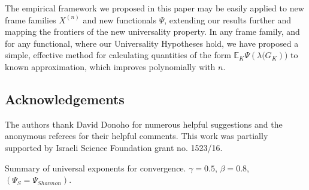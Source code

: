 \documentclass[a4paper,12pt]{article}
\newcommand{\E}{\ensuremath{\mathbb{E}}}
\newcommand{\specstat}{\ensuremath{\Psi}}
\begin{document}
The empirical framework we proposed in this paper may be easily applied to new
frame families $X^{(n)}$ and new functionals $\Psi$, extending our results further and
mapping the frontiers of the new universality property. 
In any frame family, and for any functional, where our Universality Hypotheses hold, we
have proposed a simple, effective method for calculating quantities of the form 
$\E_K \Psi\left( \lambda(G_K \right))$ to known approximation, which improves
	polynomially with $n$. 








	\subsection*{Acknowledgements} 
	The authors thank David Donoho for numerous helpful suggestions and the anonymous referees for their helpful comments. 
This work was partially supported by Israeli Science Foundation grant no.
1523/16.



%


\begin{table}
   \centering

\caption{Summary of universal exponents for convergence. $\gamma = 0.5$, $\beta = 0.8$, $(\specstat_{S}=\specstat_{Shannon})$.
\label{ExpSummary}
}
\end{table}
\end{document}
